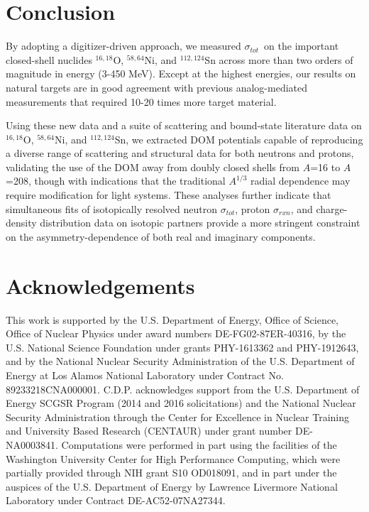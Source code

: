 \documentclass[twocolumn,secnumarabic,amssymb, nobibnotes, aps, prl,
superscriptaddress, nobalancelastpage, floatfix]{revtex4}
\newcommand{\tot}{\ensuremath{\sigma_{tot}}}
\newcommand{\rxn}{\ensuremath{\sigma_{rxn}}}
\newcommand{\oSixEight}{\ensuremath{^{16,18}}O}
\newcommand{\niEightFour}{\ensuremath{^{58,64}}N\lowercase{i}}
\newcommand{\snTwelveFour}{\ensuremath{^{112,124}}S\lowercase{n}}
\begin{document}
{\section{Conclusion}
By adopting a digitizer-driven
approach, we measured \tot\ on the important closed-shell nuclides
$^{16,18}$O, $^{58,64}$Ni, and $^{112,124}$Sn across more than two orders of
magnitude in energy (3-450 MeV). Except at the highest energies, our results
on natural targets are in good agreement with previous analog-mediated measurements
that required 10-20 times more target material. 

Using these new data and a suite of scattering and bound-state literature data
on \oSixEight, \niEightFour, and \snTwelveFour,
we extracted DOM potentials capable of reproducing a diverse range of scattering
and structural data for both neutrons and protons, validating the use of the
DOM away from doubly closed shells from $A$=16 to $A$=208, though with indications
that the traditional $A^{1/3}$ radial dependence may require modification for light systems.
These analyses further indicate that simultaneous fits of isotopically resolved neutron \tot,
proton \rxn, and charge-density distribution data on isotopic partners provide a more
stringent constraint on the asymmetry-dependence of both real and imaginary components.

\section{Acknowledgements}
This work is supported by the U.S. Department of Energy, Office of Science, 
Office of Nuclear Physics under award numbers DE-FG02-87ER-40316,
by the U.S. National Science Foundation under grants PHY-1613362 and PHY-1912643, 
and by the National Nuclear Security Administration of the U.S. Department of
Energy at Los Alamos National Laboratory under Contract No.  89233218CNA000001.
C.D.P. acknowledges support from the
U.S. Department of Energy SCGSR Program (2014 and 2016 solicitations) and the
National Nuclear Security Administration through the Center for Excellence in Nuclear
Training and University Based Research (CENTAUR) under grant number DE-NA0003841.
Computations were performed in part using the facilities of the Washington University
Center for High Performance Computing, which were partially provided through NIH
grant S10 OD018091, and in part under the auspices of the U.S. Department of Energy
by Lawrence Livermore National Laboratory under Contract DE-AC52-07NA27344.

}
\end{document}
